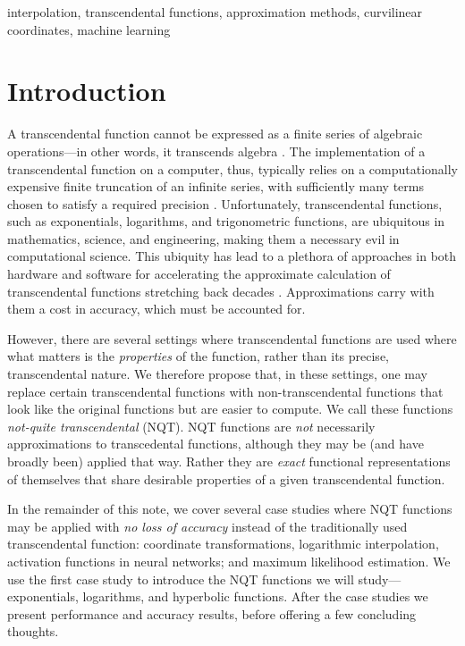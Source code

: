 \documentclass[a4paper,fleqn]{cas-sc}
\begin{document}
\begin{keywords}
  interpolation, transcendental functions, approximation methods, curvilinear coordinates, machine learning
\end{keywords}

\maketitle

\section{Introduction}
\label{sec:intro}

A transcendental function cannot be expressed as a finite series of
algebraic operations---in other words, it transcends algebra
\citep{townsend1915functions}. The implementation of a transcendental
function on a computer, thus, typically relies on a computationally
expensive finite truncation of an infinite series, with sufficiently
many terms chosen to satisfy a required precision
\citep{cody1980software}. Unfortunately, transcendental functions,
such as exponentials, logarithms, and trigonometric functions, are
ubiquitous in mathematics, science, and engineering, making them a
necessary evil in computational science. This ubiquity has lead to a
plethora of approaches in both hardware and software for accelerating
the approximate calculation of transcendental functions stretching
back decades \citep{Marino1672109, PERINI201837}. Approximations
carry with them a cost in accuracy, which must be accounted for.

However, there are several settings where transcendental functions are
used where what matters is the \textit{properties} of the function,
rather than its precise, transcendental nature. We therefore propose
that, in these settings, one may replace certain transcendental
functions with non-transcendental functions that look like the
original functions but are easier to compute. We call these functions
\textit{not-quite transcendental} (NQT). NQT functions are
\textit{not} necessarily approximations to transcedental functions,
although they may be (and have broadly been) applied that way. Rather
they are \textit{exact} functional representations of themselves that
share desirable properties of a given transcendental function.

In the remainder of this note, we cover several case studies where NQT
functions may be applied with \textit{no loss of accuracy} instead of
the traditionally used transcendental function: coordinate
transformations, logarithmic interpolation, activation functions in
neural networks; and maximum likelihood estimation. We use the first
case study to introduce the NQT functions we will
study---exponentials, logarithms, and hyperbolic functions. After the
case studies we present performance and accuracy results, before
offering a few concluding thoughts.
\end{document}
